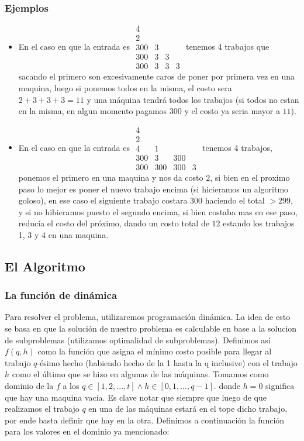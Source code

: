\documentclass[A4paper,oneside,fleqn,11pt]{article}
\theoremstyle{definition}
\begin{document}
\subsubsection{Ejemplos}
\begin{itemize}
\item En el caso en que la entrada es $\begin{matrix}
  4 &  &  &  \\
  2 &  &  &  \\
  300 & 3 &  &  \\
  300 & 3 & 3 &  \\
  300 & 3 & 3 & 3 
\end{matrix}$ tenemos 4 trabajos que sacando el primero son excesivamente caros de poner por primera vez en una maquina, luego si ponemos todos en la misma, el costo sera $2+3+3+3=11$ y una máquina tendrá todos los trabajos (si todos no estan en la misma, en algun momento pagamos $300$ y el costo ya seria mayor a $11$).
\item En el caso en que la entrada es $\begin{matrix}
  4 &  &  &  \\
  2 &  &  &  \\
  4 & 1 &  &  \\
  300 & 3 & 300 &  \\
  300 & 300 & 300 & 3 
\end{matrix}$ tenemos 4 trabajos, ponemos el primero en una maquina y nos da costo $2$, si bien en el proximo paso lo mejor es poner el nuevo trabajo encima (si hicieramos un algoritmo goloso), en ese caso el siguiente trabajo costara $300$ haciendo el total $>299$, y si no hibieramos puesto el segundo encima, si bien costaba mas en ese paso, reducía el costo del próximo, dando un costo total de $12$ estando los trabajos 1, 3 y 4 en una maquina.
\end{itemize}


\subsection{El Algoritmo}

\subsubsection{La función de dinámica}
Para resolver el problema, utilizaremos programación dinámica. La idea de esto se basa en que la solución de nuestro problema es calculable en base a la solucion de subproblemas (utilizamos optimalidad de subproblemas). Definimos así $f(q,h)$ como la función que asigna el mínimo costo posible para llegar al trabajo $q$-ésimo hecho (habiendo hecho de la 1 hasta la q inclusive) con el trabajo $h$ como el último que se hizo en algunas de las máquinas. Tomamos como dominio de la $f$ a los $q \in [1,2,...,t] \land h \in [0,1,...,q-1]$. donde $h=0$ significa que hay una maquina vacía. Es clave notar que siempre que luego de que realizamos el trabajo $q$ en una de las máquinas estará en el tope dicho trabajo, por ende basta definir que hay en la otra. Definimos a continuación la función para los valores en el dominio ya mencionado:
\end{document}
